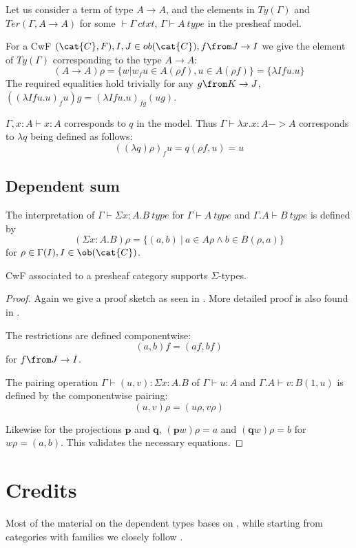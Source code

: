 \begin{example}
  Let us consider a term of type $A \to A$, and the elements in $Ty(\Gamma)$
  and $Ter(\Gamma, A \to A)$ for some $\vdash \Gamma~ctxt$, $\Gamma \vdash
  A~type$ in the presheaf model.

  For a CwF $(\cat{C}, F), I, J \in ob(\cat{C}), f \from J \to I$ we give the
  element of $\mathit{Ty}(\Gamma)$ corresponding to the type $A \to A$:
  \[
    (A \to A)\rho = \{w | w_f u \in A(\rho f), u \in A(\rho f)\} = \{\lambda I f u.u\}
  \]
  The required equalities hold trivially for any $g \from K \to J$, $((\lambda
  I f u.u)_f u) g = (\lambda I f u.u)_{fg} (ug)$.

  $\Gamma, x : A \vdash x : A$ corresponds to $q$ in the model. Thus $\Gamma
  \vdash \lambda x.x : A -> A$ corresponds to $\lambda q$ being defined as
  follows:
  \[
    ((\lambda q) \rho)_f u = q(\rho f, u) = u
  \]
\end{example}

\subsection*{Dependent sum}
The interpretation of $\Gamma \vdash \Sigma x:A.B~type$ for $\Gamma \vdash
A~type$ and $\Gamma.A \vdash B~type$ is defined by
\[
  (\Sigma x :A. B)\rho = \{(a, b)~|~a \in A\rho \land b \in B(\rho, a)\}
\]
for $\rho \in \Gamma(I), I \in \ob(\cat{C})$.
\begin{lemma}
  CwF associated to a presheaf category supports $\Sigma$-types.
  \begin{proof}
    Again we give a proof sketch as seen in \cite{Huber}. More detailed proof
    is also found in \cite{Hofmann}.

    The restrictions are defined componentwise:
    \[
      (a, b)f = (af, bf)
    \]
    for $f \from J \to I$.

    The pairing operation $\Gamma \vdash (u, v) : \Sigma x:A.B$ of $\Gamma
    \vdash u : A$ and $\Gamma.A \vdash v : B(1, u)$ is defined by the
    componentwise pairing:
    \[
      (u, v)\rho = (u\rho, v\rho)
    \]

    Likewise for the projections $\mathbf{p}$ and $\mathbf{q}$,
    $(\mathbf{p}w)\rho = a$ and $(\mathbf{q}w)\rho = b$ for $w\rho = (a, b)$.
    This validates the necessary equations.
  \end{proof}
\end{lemma}

\section*{Credits}

Most of the material on the dependent types bases on \cite{Hofmann}, while
starting from categories with families we closely follow \cite{Huber}.





